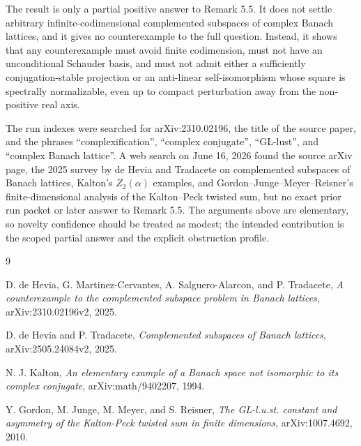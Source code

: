 \documentclass[11pt]{article}
\theoremstyle{remark}
\begin{document}
The result is only a partial positive answer to Remark 5.5.  It does not
settle arbitrary infinite-codimensional complemented subspaces of complex
Banach lattices, and it gives no counterexample to the full question.
Instead, it shows that any counterexample must avoid finite codimension, must
not have an unconditional Schauder basis, and must not admit either a
sufficiently conjugation-stable projection or an anti-linear self-isomorphism
whose square is spectrally normalizable, even up to compact perturbation away
from the non-positive real axis.

The run indexes were searched for arXiv:2310.02196, the title of the source
paper, and the phrases ``complexification'', ``complex conjugate'',
``GL-lust'', and ``complex Banach lattice''.  A web search on June 16, 2026
found the source arXiv page, the 2025 survey by de Hevia and Tradacete on
complemented subspaces of Banach lattices, Kalton's \(Z_2(\alpha)\) examples,
and Gordon--Junge--Meyer--Reisner's finite-dimensional analysis of the
Kalton--Peck twisted sum, but no exact prior run packet or later answer to
Remark 5.5.  The arguments above are elementary, so novelty confidence should
be treated as modest; the intended contribution is the scoped partial answer
and the explicit obstruction profile.

\begin{thebibliography}{9}

D. de Hevia, G. Martinez-Cervantes, A. Salguero-Alarcon, and P. Tradacete,
\emph{A counterexample to the complemented subspace problem in Banach
lattices}, arXiv:2310.02196v2, 2025.

D. de Hevia and P. Tradacete,
\emph{Complemented subspaces of Banach lattices}, arXiv:2505.24084v2, 2025.

N. J. Kalton,
\emph{An elementary example of a Banach space not isomorphic to its complex
conjugate}, arXiv:math/9402207, 1994.

Y. Gordon, M. Junge, M. Meyer, and S. Reisner,
\emph{The GL-l.u.st. constant and asymmetry of the Kalton-Peck twisted sum in
finite dimensions}, arXiv:1007.4692, 2010.

\end{thebibliography}
\end{document}

